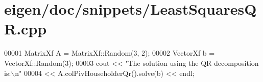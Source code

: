 \hypertarget{eigen_2doc_2snippets_2_least_squares_q_r_8cpp_source}{}\section{eigen/doc/snippets/\+Least\+Squares\+QR.cpp}
\label{eigen_2doc_2snippets_2_least_squares_q_r_8cpp_source}

\begin{DoxyCode}
00001 MatrixXf A = MatrixXf::Random(3, 2);
00002 VectorXf b = VectorXf::Random(3);
00003 cout << \textcolor{stringliteral}{"The solution using the QR decomposition is:\(\backslash\)n"}
00004      << A.colPivHouseholderQr().solve(b) << endl;
\end{DoxyCode}
